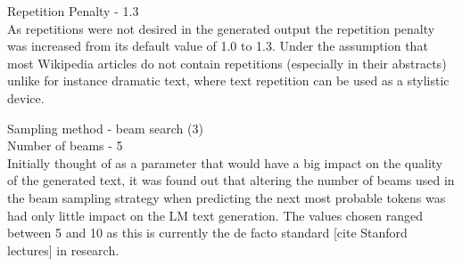 Repetition Penalty - 1.3 \\
As repetitions were not desired in the generated output the repetition penalty was increased from its default value of 1.0 to 1.3. Under the 
assumption that most Wikipedia articles do not contain repetitions (especially in their abstracts) unlike for instance dramatic text, where text 
repetition can be used as a stylistic device.

Sampling method - beam search (3) \\


Number of beams - 5 \\
Initially thought of as a parameter that would have a big impact on the quality of the generated text, it was found out that altering the number 
of beams used in the beam sampling strategy when predicting the next most probable tokens was had only little impact on the LM text generation. 
The values chosen ranged between 5 and 10 as this is currently the de facto standard [cite Stanford lectures] in research.
